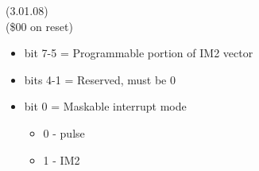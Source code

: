  (3.01.08)\\
(\$00 on reset)
\begin{itemize}
\item bit 7-5 = Programmable portion of IM2 vector
\item bits 4-1 = Reserved, must be 0
\item bit 0 = Maskable interrupt mode
\begin{itemize}
\item[] 0 - pulse
\item[] 1 - IM2
\end{itemize}
\end{itemize}
